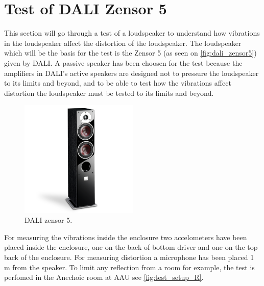 \section{Test of DALI Zensor 5}
This section will go through a test of a loudspeaker to understand how vibrations in the loudspeaker affect the distortion of the loudspeaker.
The loudspeaker which will be the basis for the test is the Zensor 5 (as seen on \autoref{fig:dali_zensor5}) given by DALI. A passive speaker has been choosen for the test because the amplifiers in DALI's active speakers are designed not to pressure the loudspeaker to its limits and beyond, and to be able to test how the vibrations affect distortion the loudspeaker must be tested to its limits and beyond.

\begin{figure}[H]
\centering
\includegraphics[width=0.5\textwidth]{figures/zensor5.png}
\caption{DALI zensor 5.}
\label{fig:dali_zensor5}
\end{figure}


For measuring the vibrations inside the enclosure two accelometers have been placed inside the enclosure, one on the back of bottom driver and one on the top back of the enclosure. For measuring distortion a microphone has been placed 1 m from the speaker. To limit any reflection from a room for example, the test is perfomed in the Anechoic room at \gls{AAU} see \ref{fig:test_setup_R}.   

